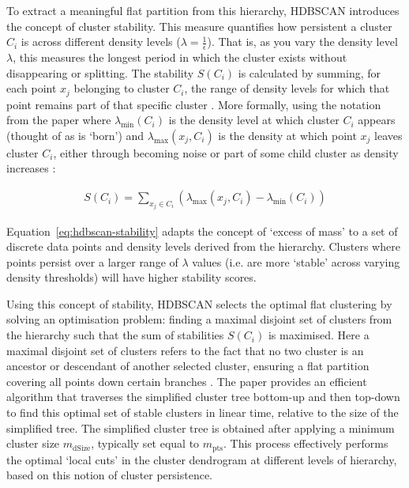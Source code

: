 \documentclass[10pt,oneside]{report}
\begin{document}
To extract a meaningful flat partition from this hierarchy, HDBSCAN introduces the concept of cluster stability. This measure quantifies how persistent a cluster $C_i$ is across different density levels ($\lambda = \frac 1 \epsilon$). That is, as you vary the density level $\lambda$, this measures the longest period in which the cluster exists without disappearing or splitting. The stability $S(C_i)$ is calculated by summing, for each point $x_j$ belonging to cluster $C_i$, the range of density levels for which that point remains part of that specific cluster \cite{campello2013density}. More formally, using the notation from the paper where $\lambda_{\text{min}}(C_i)$ is the density level at which cluster $C_i$ appears (thought of as is `born') and $\lambda_{\text{max}}(x_j, C_i)$ is the density at which point $x_j$ leaves cluster $C_i$, either through becoming noise or part of some child cluster as density increases \cite{campello2013density}:

\begin{align}
S(C_i) = \sum_{x_j \in C_i} (\lambda_{\text{max}}(x_j, C_i) - \lambda_{\text{min}}(C_i))
\label{eq:hdbscan-stability}
\end{align}

Equation~\ref{eq:hdbscan-stability} adapts the concept of `excess of mass' \cite{muller1991excess} to a set of discrete data points and density levels derived from the hierarchy. Clusters where points persist over a larger range of $\lambda$ values (i.e. are more `stable' across varying density thresholds) will have higher stability scores.

Using this concept of stability, HDBSCAN selects the optimal flat clustering by solving an optimisation problem: finding a maximal disjoint set of clusters from the hierarchy  such that the sum of stabilities $S(C_i)$ is maximised. Here a maximal disjoint set of clusters refers to the fact that no two cluster is an ancestor or descendant of another selected cluster, ensuring a flat partition covering all points down certain branches \cite{campello2013density}. The paper provides an efficient algorithm that traverses the simplified cluster tree bottom-up and then top-down to find this optimal set of stable clusters in linear time, relative to the size of the simplified tree. The simplified cluster tree is obtained after applying a minimum cluster size $m_{\text{dSize}}$, typically set equal to $m_{\text{pts}}$. This process effectively performs the optimal `local cuts' in the cluster dendrogram at different levels of hierarchy, based on this notion of cluster persistence.
\end{document}
